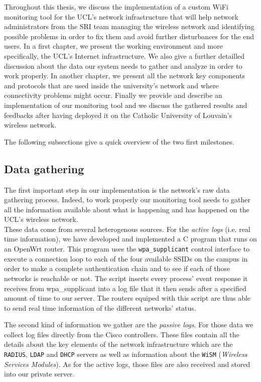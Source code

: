 Throughout this thesis, we discuss the implementation of a custom WiFi monitoring tool for the UCL's network infrastructure that will help network administrators from the SRI team managing the wireless network and identifying possible problems in order to fix them and avoid further disturbances for the end users. In a first chapter, we present the working environment and more specifically, the UCL's Internet infrastructure. We also give a further detailled discussion about the data our system needs to gather and analyze in order to work properly. In another chapter, we present all the network key components and protocols that are used inside the university's network and where connectivity problems might occur. Finally we provide and describe an implementation of our monitoring tool and we discuss the gathered results and feedbacks after having deployed it on the Catholic University of Louvain's wireless network.

The following subsections give a quick overview of the two first milestones.


\subsection{Data gathering}
The first important step in our implementation is the network's raw data gathering process. Indeed, to work properly our monitoring tool needs to gather all the information available about what is happening and has happened on the UCL's wireless network.\\
These data come from several heterogenous sources. For the \textit{active logs} (i.e. real time information), we have developed and implemented a C program that runs on an OpenWrt router. This program uses the \texttt{wpa\_supplicant} control interface to execute a connection loop to each of the four available SSIDs on the campus in order to make a complete authentication chain and to see if each of those networks is reachable or not. The script inserts every process' event response it receives from wpa\_supplicant into a log file that it then sends after a specified amount of time to our server. The routers equiped with this script are thus able to send real time information of the different networks' status.

The second kind of information we gather are the \textit{passive logs}. For those data we collect log files directly from the Cisco controllers. These files contain all the details about the key elements of the network infrastructure which are the \texttt{RADIUS}, \texttt{LDAP} and \texttt{DHCP} servers as well as information about the \texttt{WiSM} (\textit{Wireless Services Modules}). As for the active logs, those files are also received and stored into our private server.



